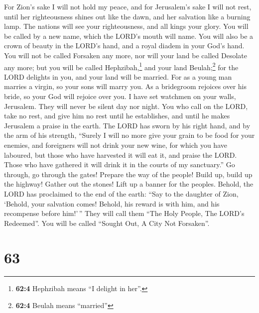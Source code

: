  For Zion's sake I will not hold my peace, and for
Jerusalem's sake I will not rest, until her righteousness shines out
like the dawn, and her salvation like a burning lamp.  The
nations will see your righteousness, and all kings your glory. You will
be called by a new name, which the LORD's mouth will name.
 You will also be a crown of beauty in the LORD's hand,
and a royal diadem in your God's hand.  You will not be
called Forsaken any more, nor will your land be called Desolate any
more; but you will be called Hephzibah,\footnote{\textbf{62:4} Hephzibah
  means ``I delight in her''.} and your land Beulah;\footnote{\textbf{62:4}
  Beulah means ``married''} for the LORD delights in you, and your land
will be married.  For as a young man marries a virgin, so
your sons will marry you. As a bridegroom rejoices over his bride, so
your God will rejoice over you.  I have set watchmen on
your walls, Jerusalem. They will never be silent day nor night. You who
call on the LORD, take no rest,  and give him no rest
until he establishes, and until he makes Jerusalem a praise in the
earth.  The LORD has sworn by his right hand, and by the
arm of his strength, ``Surely I will no more give your grain to be food
for your enemies, and foreigners will not drink your new wine, for which
you have laboured,  but those who have harvested it will
eat it, and praise the LORD. Those who have gathered it will drink it in
the courts of my sanctuary.''  Go through, go through the
gates! Prepare the way of the people! Build up, build up the highway!
Gather out the stones! Lift up a banner for the peoples. 
Behold, the LORD has proclaimed to the end of the earth: ``Say to the
daughter of Zion, `Behold, your salvation comes! Behold, his reward is
with him, and his recompense before him!'\,''  They will
call them ``The Holy People, The LORD's Redeemed''. You will be called
``Sought Out, A City Not Forsaken''.

\hypertarget{section-60}{%
\section{63}\label{section-60}}

